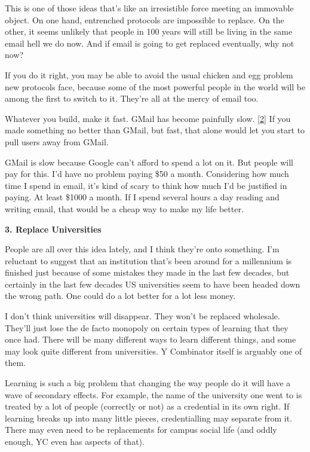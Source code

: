 This is one of those ideas that's like an irresistible force meeting an
immovable object. On one hand, entrenched protocols are impossible to
replace. On the other, it seems unlikely that people in 100 years will
still be living in the same email hell we do now. And if email is going
to get replaced eventually, why not now?

If you do it right, you may be able to avoid the usual chicken and egg
problem new protocols face, because some of the most powerful people in
the world will be among the first to switch to it. They're all at the
mercy of email too.

Whatever you build, make it fast. GMail has become painfully slow.
{[}\hyperref[f2n]{2}{]} If you made something no better than GMail, but
fast, that alone would let you start to pull users away from GMail.

GMail is slow because Google can't afford to spend a lot on it. But
people will pay for this. I'd have no problem paying \$50 a month.
Considering how much time I spend in email, it's kind of scary to think
how much I'd be justified in paying. At least \$1000 a month. If I spend
several hours a day reading and writing email, that would be a cheap way
to make my life better.

\textbf{3. Replace Universities}

People are all over this idea lately, and I think they're onto
something. I'm reluctant to suggest that an institution that's been
around for a millennium is finished just because of some mistakes they
made in the last few decades, but certainly in the last few decades US
universities seem to have been headed down the wrong path. One could do
a lot better for a lot less money.

I don't think universities will disappear. They won't be replaced
wholesale. They'll just lose the de facto monopoly on certain types of
learning that they once had. There will be many different ways to learn
different things, and some may look quite different from universities. Y
Combinator itself is arguably one of them.

Learning is such a big problem that changing the way people do it will
have a wave of secondary effects. For example, the name of the
university one went to is treated by a lot of people (correctly or not)
as a credential in its own right. If learning breaks up into many little
pieces, credentialling may separate from it. There may even need to be
replacements for campus social life (and oddly enough, YC even has
aspects of that).

